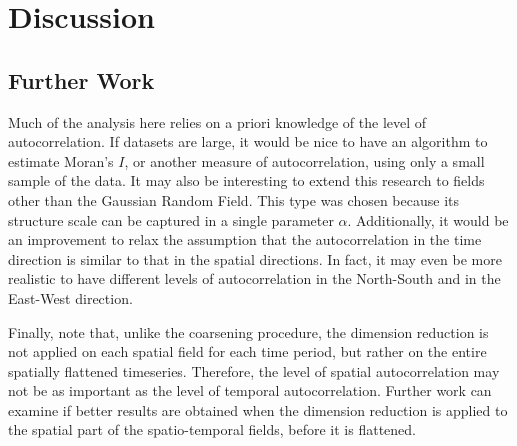 \documentclass[ijgi,article,submit,moreauthors,pdftex,10pt,a4paper]{Definitions/mdpi}
\begin{document}



\section{Discussion}


\subsection{Further Work}
\label{sec:Discussion/Further Work}

Much of the analysis here relies on a priori knowledge of the level of autocorrelation. If datasets are large, it would be nice to have an algorithm to estimate Moran's $I$, or another measure of autocorrelation, using only a small sample of the data. It may also be interesting to extend this research to fields other than the Gaussian Random Field. This type was chosen because its structure scale can be captured in a single parameter $\alpha$. Additionally, it would be an improvement to relax the assumption that the autocorrelation in the time direction is similar to that in the spatial directions. In fact, it may even be more realistic to have different levels of autocorrelation in the North-South and in the East-West direction.

Finally, note that, unlike the coarsening procedure, the dimension reduction is not applied on each spatial field for each time period, but rather on the entire spatially flattened timeseries. Therefore, the level of spatial autocorrelation may not be as important as the level of temporal autocorrelation. Further work can examine if better results are obtained when the dimension reduction is applied to the spatial part of the spatio-temporal fields, before it is flattened.
\end{document}
